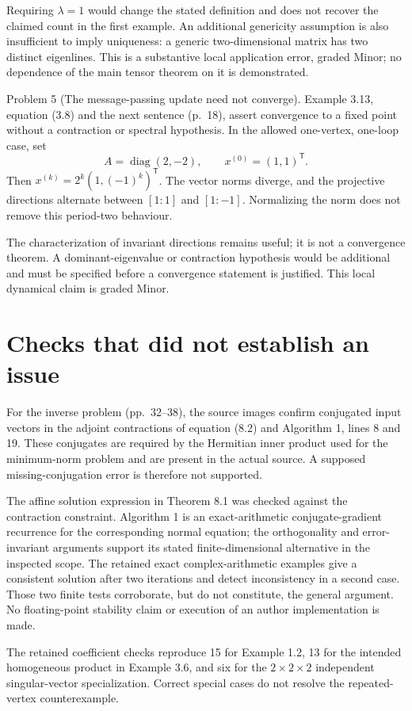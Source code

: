 \documentclass[10pt]{article}
\begin{document}
Requiring \(\lambda=1\) would change the stated definition and does not recover the claimed count in the first example. An additional genericity assumption is also insufficient to imply uniqueness: a generic two-dimensional matrix has two distinct eigenlines. This is a substantive local application error, graded Minor; no dependence of the main tensor theorem on it is demonstrated.\par
Problem 5 (The message-passing update need not converge).  Example 3.13, equation (3.8) and the next sentence (p. 18), assert convergence to a fixed point without a contraction or spectral hypothesis. In the allowed one-vertex, one-loop case, set \[A=\operatorname{diag}(2,-2),\qquad x^{(0)}=(1,1)^{\mathsf T}.\] Then \(x^{(k)}=2^k(1,(-1)^k)^{\mathsf T}\). The vector norms diverge, and the projective directions alternate between \([1:1]\) and \([1:-1]\). Normalizing the norm does not remove this period-two behaviour.\par
The characterization of invariant directions remains useful; it is not a convergence theorem. A dominant-eigenvalue or contraction hypothesis would be additional and must be specified before a convergence statement is justified. This local dynamical claim is graded Minor.\par
\section*{Checks that did not establish an issue}
For the inverse problem (pp. 32–38), the source images confirm conjugated input vectors in the adjoint contractions of equation (8.2) and Algorithm 1, lines 8 and 19. These conjugates are required by the Hermitian inner product used for the minimum-norm problem and are present in the actual source. A supposed missing-conjugation error is therefore not supported.\par
The affine solution expression in Theorem 8.1 was checked against the contraction constraint. Algorithm 1 is an exact-arithmetic conjugate-gradient recurrence for the corresponding normal equation; the orthogonality and error-invariant arguments support its stated finite-dimensional alternative in the inspected scope. The retained exact complex-arithmetic examples give a consistent solution after two iterations and detect inconsistency in a second case. Those two finite tests corroborate, but do not constitute, the general argument. No floating-point stability claim or execution of an author implementation is made.\par
The retained coefficient checks reproduce 15 for Example 1.2, 13 for the intended homogeneous product in Example 3.6, and six for the \(2\times2\times2\) independent singular-vector specialization. Correct special cases do not resolve the repeated-vertex counterexample.\par
\end{document}
